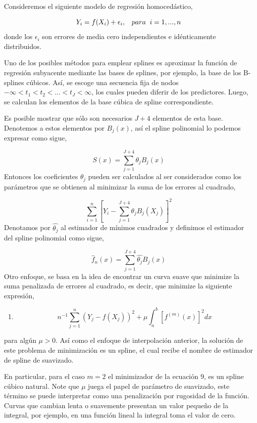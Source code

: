 \documentclass[
  12pt,
]{krantz}
\providecommand{\tightlist}{%
  \setlength{\itemsep}{0pt}\setlength{\parskip}{0pt}}
\begin{document}
Consideremos el siguiente modelo de regresión homocedástico,

\[\displaystyle{Y_{i}=f(X_{i})+\epsilon_{i}}, \hspace{0.3cm} para \hspace{0.2cm} i=1,...,n\]
donde los \(\epsilon_{i}\) son errores de media cero independientes e idénticamente distribuidos.

Uno de los posibles métodos para emplear splines es aproximar la función de regresión subyacente mediante las bases de splines, por ejemplo, la base de los B-splines cúbicos. Así, se escoge una secuencia fija de nodos \(-\infty<t_{1}<t_{2}<...<t_{J}<\infty\), los cuales pueden diferir de los predictores. Luego, se calculan los elementos de la base cúbica de spline correspondiente.

Es posible mostrar que sólo son necesarios \(J+4\) elementos de esta base. Denotemos a estos elementos por \(B_{j}(x)\), así el spline polinomial lo podemos expresar como sigue,

\[\displaystyle{S(x)=\sum_{j=1}^{J+4} \theta_{j}B_{j}(x)}\]
Entonces los coeficientes \(\theta_{j}\) pueden ser calculados al ser considerados como los parámetros que se obtienen al minimizar la suma de los errores al cuadrado,

\[\displaystyle{\sum_{i=1}^{n} \left[ Y_{i} - \sum_{j=1}^{J+4} \theta_{j}B_{j}(X_{j})\right]^2}\]
Denotamos por \(\hat{\theta_{j}}\) al estimador de mínimos cuadrados y definimos el estimador del spline polinomial como sigue,

\[\displaystyle{ \hat{f}_{n}(x) = \sum_{j=1}^{J+4} \hat{\theta_{j}}B_{j}(x)}\]
Otro enfoque, se basa en la idea de encontrar un curva suave que minimize la suma penalizada de errores al cuadrado, es decir, que minimize la siguiente expresión,

\begin{enumerate}
\def\labelenumi{(\arabic{enumi})}
\setcounter{enumi}{8}
\tightlist
\item
  \[
    n^{-1}\sum_{j=1}^{n}(Y_{j}-f(X_{j}))^2+\mu \int_{a}^{b} [f^{(m)} (x)]^2 dx
  \]
\end{enumerate}

para algún \(\mu > 0\). Así como el enfoque de interpolación anterior, la solución de este problema de minimización es un spline, el cual recibe el nombre de estimador de spline de suavizado.

En particular, para el caso \(m=2\) el minimizador de la ecuación 9, es un spline cúbico natural. Note que \(\mu\) juega el papel de parámetro de suavizado, este término se puede interpretar como una penalización por rugosidad de la función. Curvas que cambian lenta o suavemente presentan un valor pequeño de la integral, por ejemplo, en una función lineal la integral toma el valor de cero.
\end{document}
